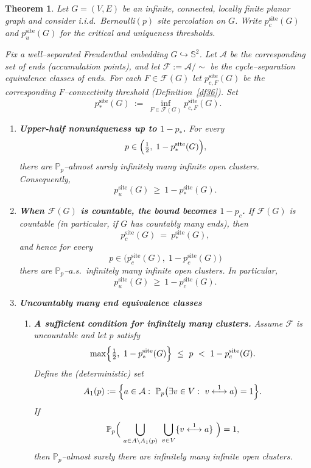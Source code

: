 \documentclass[11pt]{amsart}
\theoremstyle{plain}
\newtheorem{theorem}{Theorem}[section]
\numberwithin{equation}{section}
\numberwithin{figure}{section}
\begin{document}
\begin{theorem}\label{thm:main1}
Let $G=(V,E)$ be an infinite, connected, locally finite planar graph and consider
i.i.d.\ Bernoulli$(p)$ \emph{site} percolation on $G$.
Write $p_c^{\mathrm{site}}(G)$ and $p_u^{\mathrm{site}}(G)$ for the critical and uniqueness thresholds.

Fix a well--separated Freudenthal embedding $G\hookrightarrow \mathbb S^2$.
Let $\mathcal{A}$ be the corresponding set of ends (accumulation points), and let $\mathcal F:=\mathcal{A}/\!\sim$
be the cycle--separation equivalence classes of ends.
For each $F\in\mathcal F(G)$ let $p^{\mathrm{site}}_{c,F}(G)$ be the corresponding
$F$--connectivity threshold (Definition~\ref{df36}).
Set
\[
p_*^{\mathrm{site}}(G)\ :=\ \inf_{F\in\mathcal F(G)} p^{\mathrm{site}}_{c,F}(G).
\]

\begin{enumerate}[label=\textup{(\roman*)}]
\item \textbf{Upper-half nonuniqueness up to $1-p_*$.}
For every
\[
p\in\Bigl(\tfrac12,\;1-p_*^{\mathrm{site}}(G)\Bigr),
\]
there are $\mathbb P_p$--almost surely infinitely many infinite open clusters.
Consequently,
\[
p_u^{\mathrm{site}}(G)\ \ge\ 1-p_*^{\mathrm{site}}(G).
\]

\item \textbf{When $\mathcal F(G)$ is countable, the bound becomes $1-p_c$.}
If $\mathcal F(G)$ is countable (in particular, if $G$ has countably many ends), then
\[
p_c^{\mathrm{site}}(G)\ =\ p_*^{\mathrm{site}}(G),
\]
and hence for every
\[
p\in\bigl(p_c^{\mathrm{site}}(G),\;1-p_c^{\mathrm{site}}(G)\bigr)
\]
there are $\mathbb P_p$--a.s.\ infinitely many infinite open clusters.
In particular,
\[
p_u^{\mathrm{site}}(G)\ \ge\ 1-p_c^{\mathrm{site}}(G).
\]

\item \textbf{Uncountably many end equivalence classes}
\begin{enumerate}
\item \textbf{A sufficient condition for infinitely many clusters.}
Assume $\mathcal F$ is uncountable and let $p$ satisfy
\[
\max\Bigl\{\tfrac12,\ 1-p_*^{\mathrm{site}}(G)\Bigr\}\ \le\ p\ <\ 1-p_c^{\mathrm{site}}(G).
\]
Define the (deterministic) set
\[
A_1(p):=\Bigl\{a\in \mathcal{A}:\ \mathbb P_p\bigl(\exists v\in V:\ v \stackrel{1}{\longleftrightarrow} a\bigr)=1\Bigr\}.
\]
If
\begin{equation}\label{eq:case2a}
\mathbb P_p\Bigl(\ \bigcup_{a\in A\setminus A_1(p)}\ \bigcup_{v\in V}\{v \stackrel{1}{\longleftrightarrow} a\}\ \Bigr)=1,
\end{equation}
 then $\mathbb P_p$--almost surely there are infinitely many
infinite open clusters.


\end{enumerate}
\end{enumerate}
\end{theorem}
\end{document}
